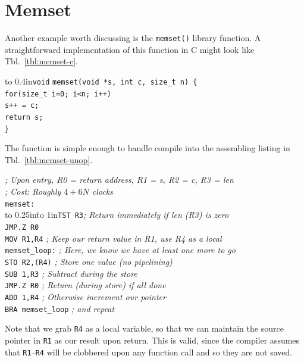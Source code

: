 \documentclass{gqtekspec}
\begin{document}
\section{Memset}
Another example worth discussing is the {\tt memset()} library function.
A straightforward implementation of this function in C might look like
Tbl.~\ref{tbl:memset-c}.
\begin{table}\begin{center}
\begin{tabbing}
\hbox to 0.4in{\tt void} \= {\tt *memset(void *s, int c, size\_t n) \{} \\
	\> {\tt for(size\_t i=0; i<n; i++)} \\
	\> \hspace{0.4in} {\tt *s++ = c;} \\
	\> {\tt return s;}\\
{\tt \}}
\end{tabbing}
\caption{Example Memset code}\label{tbl:memset-c}
\end{center}\end{table}
The function is simple enough to handle compile into the assembling listing in
Tbl.~\ref{tbl:memset-unop}.
\begin{table}\begin{center}
\begin{tabbing}
{\em ; Upon entry, R0 = return address, R1 = s, R2 = c, R3 = len}\\
{\em ; Cost: Roughly $4+6N$ clocks}\\
{\tt memset:}\\
\hbox to 0.25in{}\=\hbox to 1in{\tt TST R3}\={\em ; Return immediately if len (R3) is zero}\\
\>	{\tt JMP.Z R0}\\
\>	{\tt MOV R1,R4} \> {\em ; Keep our return value in R1, use R4 as a local}\\
{\tt memset\_loop:}\>\> {\em ; Here, we know we have at least one more to go}\\
\>	{\tt STO R2,(R4)} \> {\em	; Store one value (no pipelining)} \\
\>	{\tt SUB 1,R3} \> {\em; Subtract during the store}\\
\>	{\tt JMP.Z R0} \> {\em; Return (during store) if all done}\\
\>	{\tt ADD 1,R4} \> {\em; Otherwise increment our pointer}\\
\>	{\tt BRA memset\_loop} {\em ; and repeat}\\
\end{tabbing}
\caption{Example Memset code, minimally optimized}\label{tbl:memset-unop}
\end{center}\end{table}
Note that we grab {\tt R4} as a local variable, so that we can maintain the
source pointer in {\tt R1} as our result upon return.  This is valid, since the
compiler assumes that {\tt R1}--{\tt R4} will be clobbered upon any function
call and so they are not saved.
\end{document}
